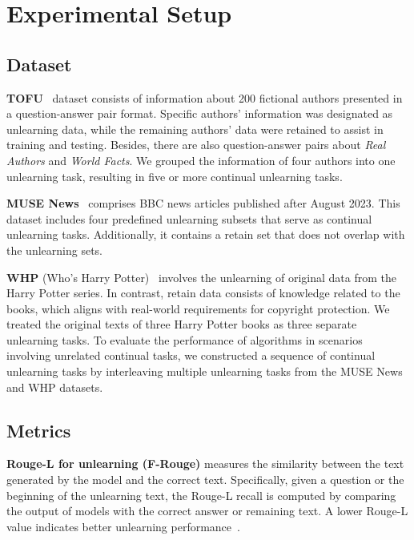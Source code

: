 \documentclass{article}
\theoremstyle{plain}
\theoremstyle{definition}
\theoremstyle{remark}
\begin{document}
\section{Experimental Setup}
\subsection{Dataset}

\textbf{TOFU}~\cite{DBLP:journals/corr/abs-2401-06121} dataset consists of information about 200 fictional authors presented in a question-answer pair format. Specific authors' information was designated as unlearning data, while the remaining authors' data were retained to assist in training and testing. Besides, there are also question-answer pairs about \textit{Real Authors} and \textit{World Facts}. We grouped the information of four authors into one unlearning task, resulting in five or more continual unlearning tasks.

\textbf{MUSE News}~\cite{DBLP:journals/corr/abs-2407-06460} comprises BBC news articles published after August 2023. This dataset includes four predefined unlearning subsets that serve as continual unlearning tasks. Additionally, it contains a retain set that does not overlap with the unlearning sets.

\textbf{WHP} (Who's Harry Potter)~\cite{DBLP:journals/corr/abs-2310-02238,DBLP:journals/corr/abs-2407-06460} involves the unlearning of original data from the Harry Potter series. In contrast, retain data consists of knowledge related to the books, which aligns with real-world requirements for copyright protection. We treated the original texts of three Harry Potter books as three separate unlearning tasks.
To evaluate the performance of algorithms in scenarios involving unrelated continual tasks, we constructed a sequence of continual unlearning tasks by interleaving multiple unlearning tasks from the MUSE News and WHP datasets.

\subsection{Metrics}
\textbf{Rouge-L for unlearning (F-Rouge)} measures the similarity between the text generated by the model and the correct text. Specifically, given a question or the beginning of the unlearning text, the Rouge-L recall is computed by comparing the output of models with the correct answer or remaining text. A lower Rouge-L value indicates better unlearning performance~\cite{DBLP:journals/corr/abs-2401-06121, DBLP:journals/corr/abs-2407-06460}.
\end{document}
